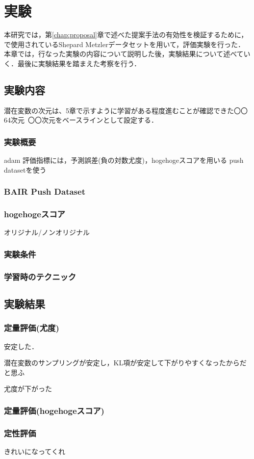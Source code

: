 \chapter{実験}
\label{chap:experiment}
本研究では，第\ref{chap:proposal}章で述べた提案手法の有効性を検証するために， で使用されているShepard Metzlerデータセットを用いて，評価実験を行った．本章では，行なった実験の内容について説明した後，実験結果について述べていく．最後に実験結果を踏まえた考察を行う．

\section{実験内容}
潜在変数の次元は、5章で示すように学習がある程度進むことが確認できた〇〇64次元~〇〇次元をベースラインとして設定する．

\subsection{実験概要}
adam
評価指標には，予測誤差(負の対数尤度)，hogehogeスコアを用いる
push datasetを使う

\subsection{BAIR Push Dataset}
\subsection{hogehogeスコア}
オリジナル/ノンオリジナル
\subsection{実験条件}
\subsection{学習時のテクニック}
\section{実験結果}
\subsection{定量評価(尤度)}

安定した．

潜在変数のサンプリングが安定し，KL項が安定して下がりやすくなったからだと思ふ

尤度が下がった

\subsection{定量評価(hogehogeスコア)}
\subsection{定性評価}
きれいになってくれ